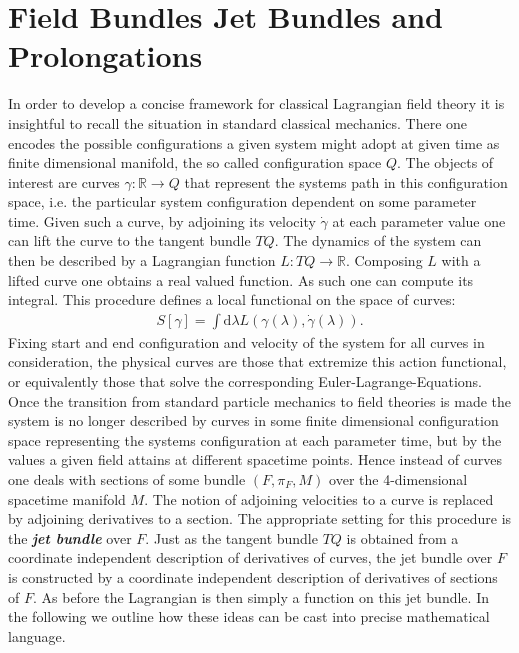 \documentclass[a4paper,12pt, DIV=14, BCOR=5mm, twoside, headsepline]{scrbook}
\begin{document}
\section{Field Bundles Jet Bundles and Prolongations}
In order to develop a concise framework for classical Lagrangian field theory it is insightful to recall the situation in standard classical mechanics. There one encodes the possible configurations a given system might adopt at given time as finite dimensional manifold, the so called configuration space $Q$. The objects of interest are curves $\gamma : \mathbb{R} \rightarrow Q $ that represent the systems path in this configuration space, i.e. the particular system configuration dependent on some parameter time. Given such a curve, by adjoining its velocity $\dot{\gamma}$ at each parameter value one can lift the curve to the tangent bundle $TQ$. The dynamics of the system can then be described by a Lagrangian function $L : TQ \rightarrow \mathbb{R}$. Composing $L$ with a lifted curve one obtains a real valued function. As such one can compute its integral. This procedure defines a local functional on the space of curves:
\begin{align}
S[\gamma] = \int \mathrm{d}\lambda L(\gamma (\lambda), \dot{\gamma} (\lambda)).  
\end{align}
Fixing start and end configuration and velocity of the system for all curves in consideration, the physical curves are those that extremize this action functional, or equivalently those that solve the corresponding Euler-Lagrange-Equations. \\


Once the transition from standard particle mechanics to field theories is made the system is no longer described by curves in some finite dimensional configuration space representing the systems configuration at each parameter time, but by the values a given field attains at different spacetime points. Hence instead of curves one deals with sections of some bundle $(F,\pi_F,M)$ over the 4-dimensional spacetime manifold $M$. The notion of adjoining velocities to a curve is replaced by adjoining derivatives to a section. The appropriate setting for this procedure is the \textit{\textbf{jet bundle}} over $F$. Just as the tangent bundle $TQ$ is obtained from a coordinate independent description of derivatives of curves, the jet bundle over $F$ is constructed by a coordinate independent description of derivatives of sections of $F$. As before the Lagrangian is then simply a function on this jet bundle. 
In the following we outline how these ideas can be cast into precise mathematical language. \\
\end{document}
